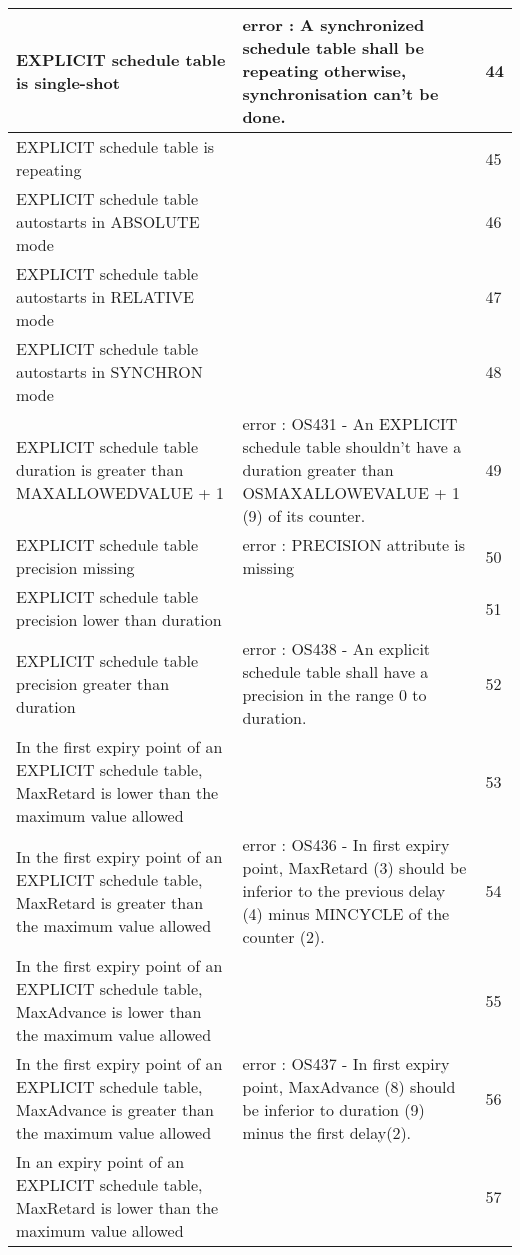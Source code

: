 \documentclass[10pt]{article}
\newlength{\Li}\settowidth{\Li}{Running}
\newlength{\Lii}\setlength{\Lii}{7cm}
\newlength{\Liiii}\setlength{\Liiii}{0.9cm}
\newlength{\Liii}\setlength{\Liii}{\textwidth} \addtolength{\Liii}{-\Li} \addtolength{\Liii}{-\Lii} \addtolength{\Liii}{-\Liiii}
\begin{document}
	\begin{supertabular}{|p{\Li}|p{\Lii}|p{\Liii}|} \hline 
	EXPLICIT schedule table is single-shot									& error : A synchronized schedule table shall be repeating otherwise, synchronisation can't be done.	& 44 \\ \hline
	EXPLICIT schedule table is repeating		 							&  																				& 45 \\ \hline
	EXPLICIT schedule table autostarts in ABSOLUTE mode						&  																				& 46 \\ \hline
	EXPLICIT schedule table autostarts in RELATIVE mode						& 																				& 47 \\ \hline
	EXPLICIT schedule table autostarts in SYNCHRON mode					& 																				& 48 \\ \hline
	EXPLICIT schedule table duration is greater than MAXALLOWEDVALUE + 1		& error : OS431 - An EXPLICIT schedule table shouldn't have a duration greater than OSMAXALLOWEVALUE + 1 (9) of its counter.				& 49 \\ \hline	
	EXPLICIT schedule table precision missing								& error : PRECISION attribute is missing													& 50 \\ \hline
	EXPLICIT schedule table precision lower than duration						& 																				& 51 \\ \hline
	EXPLICIT schedule table precision greater than duration						& error : OS438 - An explicit schedule table shall have a precision in the range 0 to duration.			& 52 \\ \hline
	In the first expiry point of an EXPLICIT schedule table, MaxRetard is lower than the maximum value allowed		& 								& 53 \\ \hline
	In the first expiry point of an EXPLICIT schedule table, MaxRetard is greater than the maximum value allowed	& error : OS436 - In first expiry point, MaxRetard (3) should be inferior to the previous delay (4) minus MINCYCLE of the counter (2).																													& 54 \\ \hline
	In the first expiry point of an EXPLICIT schedule table, MaxAdvance is lower than the maximum value allowed	& 														& 55 \\ \hline
	In the first expiry point of an EXPLICIT schedule table, MaxAdvance is greater than the maximum value allowed	& error : OS437 - In first expiry point, MaxAdvance (8) should be inferior to duration (9) minus the first delay(2).																																	& 56 \\ \hline
	In an expiry point of an EXPLICIT schedule table, MaxRetard is lower than the maximum value allowed			& 														& 57 \\ \hline

\end{supertabular}
\end{document}
